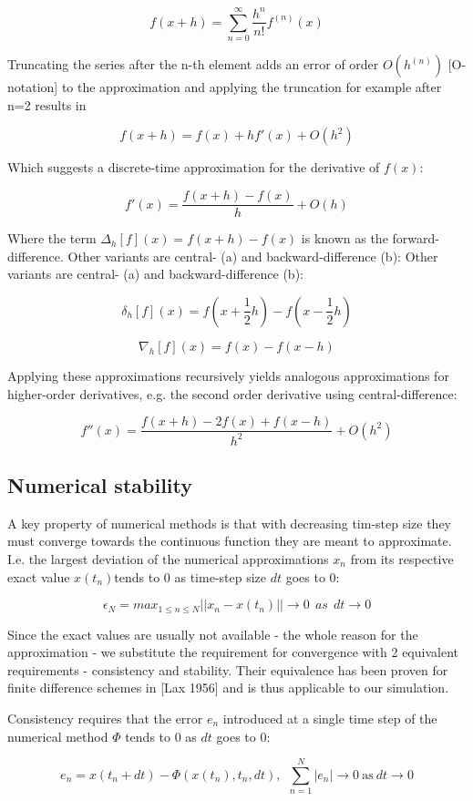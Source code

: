 \documentclass{article}
\begin{document}
$$f(x+h) = \sum_{n=0}^\infty \frac{h^n}{n!}f^{(n)}(x)$$

Truncating the series after the n-th element adds an error of order $O(h^{(n)})$ [O-notation] to the approximation and applying the truncation for example after n=2 results in 

$$f(x+h)=f(x)+hf'(x)+O(h^2)$$

Which suggests a discrete-time approximation for the derivative of $f(x)$:

$$f'(x)=\frac{f(x+h)-f(x)}{h}+O(h)$$

Where the term $\Delta_h[f](x)=f(x+h)-f(x)$ is known as the forward-difference. Other variants are central- (a) and backward-difference (b): Other variants are central- (a) and backward-difference (b):

$$\delta_h[f](x)=f(x+\frac{1}{2}h)-f(x-\frac{1}{2}h)$$

$$\nabla_h[f](x) = f(x)-f(x-h)$$

Applying these approximations recursively yields analogous approximations for higher-order derivatives, e.g. the second order derivative using central-difference:

$$f''(x)=\frac{f(x+h)-2f(x)+f(x-h)}{h^2}+O(h^2)$$


\subsection{Numerical stability}

A key property of numerical methods is that with decreasing tim-step size they must converge towards the continuous function they are meant to approximate. I.e. the largest deviation of the numerical approximations $x_n$ from its respective exact value $x(t_n)$tends to 0 as time-step size $dt$ goes to 0:

$$\epsilon_N=max_{1\le n\le N}||x_n-x(t_n)||\to0\ \ as\ \ dt\to 0$$

Since the exact values are usually not available - the whole reason for the approximation - we substitute the requirement for convergence with 2 equivalent requirements - consistency and stability. Their equivalence has been proven for finite difference schemes in [Lax 1956] and is thus applicable to our simulation.

Consistency requires that the error $e_n$ introduced at a single time step of the numerical method $\Phi$ tends to 0 as $dt$ goes to 0:

$$e_n = x(t_n+dt) - \Phi(x(t_n),t_n,dt),\ \ \sum_{n=1}^N|e_n|\to 0\ \mathrm{as}\ dt\to 0$$
\end{document}
